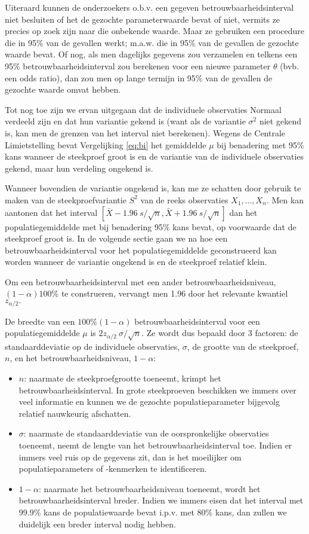 \documentclass[12pt,dutch,coursenotes]{book}
\theoremstyle{definition}
\theoremstyle{definition}
\theoremstyle{definition}
\theoremstyle{remark}
\begin{document}
Uiteraard kunnen de onderzoekers o.b.v. een gegeven
betrouwbaarheidsinterval niet besluiten of het de gezochte
parameterwaarde bevat of niet, vermits ze precies op zoek zijn naar die
onbekende waarde. Maar ze gebruiken een procedure die in 95\% van de
gevallen werkt; m.a.w. die in 95\% van de gevallen de gezochte waarde
bevat. Of nog, als men dagelijks gegevens zou verzamelen en telkens een
95\% betrouwbaarheidsinterval zou berekenen voor een nieuwe parameter
\(\theta\) (bvb. een odds ratio), dan zou men op lange termijn in 95\%
van de gevallen de gezochte waarde omvat hebben.

Tot nog toe zijn we ervan uitgegaan dat de individuele observaties
Normaal verdeeld zijn en dat hun variantie gekend is (want als de
variantie \(\sigma^2\) niet gekend is, kan men de grenzen van het
interval niet berekenen). Wegens de Centrale Limietstelling bevat
Vergelijking \eqref{eq:bi} het gemiddelde \(\mu\) bij benadering met 95\%
kans wanneer de steekproef groot is en de variantie van de individuele
observaties gekend, maar hun verdeling ongekend is.

Wanneer bovendien de variantie ongekend is, kan me ze schatten door
gebruik te maken van de steekproefvariantie \(S^2\) van de reeks
observaties \(X_1,...,X_n\). Men kan aantonen dat het interval
\([\bar{X} - 1.96 \ s/\sqrt{n} , \bar{X} + 1.96 \ s/\sqrt{n} ]\) dan het
populatiegemiddelde met bij benadering 95\% kans bevat, op voorwaarde
dat de steekproef groot is. In de volgende sectie gaan we na hoe een
betrouwbaarheidsinterval voor het populatiegemiddelde geconstrueerd kan
worden wanneer de variantie ongekend is en de steekproef relatief klein.

Om een betrouwbaarheidsinterval met een ander betrouwbaarheidsniveau,
\((1- \alpha)100\%\) te construeren, vervangt men 1.96 door het
relevante kwantiel \(z_{\alpha/2}.\)

De breedte van een \(100\%(1-\alpha)\) betrouwbaarheidsinterval voor een
populatiegemiddelde \(\mu\) is \(2 z_{\alpha/2} \ \sigma/\sqrt{n}\). Ze
wordt dus bepaald door 3 factoren: de standaarddeviatie op de
individuele observaties, \(\sigma\), de grootte van de steekproef,
\(n\), en het betrouwbaarheidsniveau, \(1-\alpha\):

\begin{itemize}
\item
  \(n\): naarmate de steekproefgrootte toeneemt, krimpt het
  betrouwbaarheidsinterval. In grote steekproeven beschikken we immers
  over veel informatie en kunnen we de gezochte populatieparameter
  bijgevolg relatief nauwkeurig afschatten.
\item
  \(\sigma\): naarmate de standaarddeviatie van de oorspronkelijke
  observaties toeneemt, neemt de lengte van het betrouwbaarheidsinterval
  toe. Indien er immers veel ruis op de gegevens zit, dan is het
  moeilijker om populatieparameters of -kenmerken te identificeren.
\item
  \(1-\alpha\): naarmate het betrouwbaarheidsniveau toeneemt, wordt het
  betrouwbaarheidsinterval breder. Indien we immers eisen dat het
  interval met 99.9\% kans de populatiewaarde bevat i.p.v. met 80\%
  kans, dan zullen we duidelijk een breder interval nodig hebben.
\end{itemize}
\end{document}

